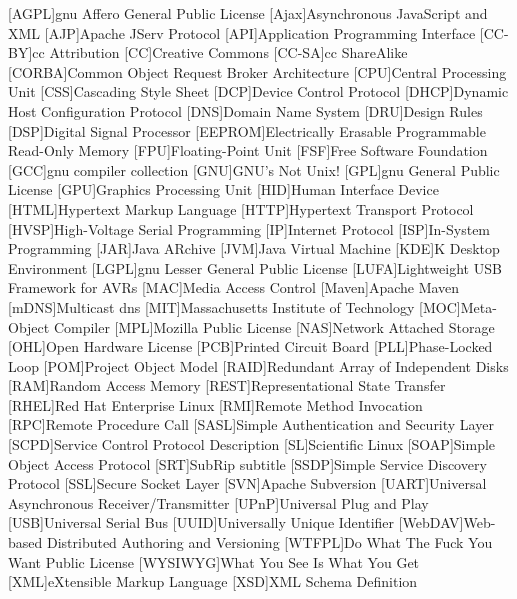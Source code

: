 \begin{acronym}[WYSIWYG]	%
[AGPL]{\acs{gnu} Affero General Public License}
[Ajax]{Asynchronous JavaScript and XML}
[AJP]{Apache JServ Protocol}
[API]{Application Programming Interface}
[CC-BY]{\acl{cc} Attribution}
[CC]{Creative Commons}
[CC-SA]{\acl{cc} ShareAlike}
[CORBA]{Common Object Request Broker Architecture}
[CPU]{Central Processing Unit}
[CSS]{Cascading Style Sheet}
[DCP]{Device Control Protocol}
[DHCP]{Dynamic Host Configuration Protocol}
[DNS]{Domain Name System}
[DRU]{Design Rules}
[DSP]{Digital Signal Processor}
[EEPROM]{Electrically Erasable Programmable Read-Only Memory}
[FPU]{Floating-Point Unit}
[FSF]{Free Software Foundation}
[GCC]{\acs{gnu} compiler collection}
[GNU]{GNU's Not Unix!}
[GPL]{\acs{gnu} General Public License}
[GPU]{Graphics Processing Unit}
[HID]{Human Interface Device}
[HTML]{Hypertext Markup Language}
[HTTP]{Hypertext Transport Protocol}
[HVSP]{High-Voltage Serial Programming}
[IP]{Internet Protocol}
[ISP]{In-System Programming}
[JAR]{Java ARchive}
[JVM]{Java Virtual Machine}
[KDE]{K Desktop Environment}
[LGPL]{\acs{gnu} Lesser General Public License}
[LUFA]{Lightweight USB Framework for AVRs}
[MAC]{Media Access Control}
[Maven]{Apache Maven}
[mDNS]{Multicast \acs{dns}}
[MIT]{Massachusetts Institute of Technology}
[MOC]{Meta-Object Compiler}
[MPL]{Mozilla Public License}
[NAS]{Network Attached Storage}
[OHL]{Open Hardware License}
[PCB]{Printed Circuit Board}
[PLL]{Phase-Locked Loop}
[POM]{Project Object Model}
[RAID]{Redundant Array of Independent Disks}
[RAM]{Random Access Memory}
[REST]{Representational State Transfer}
[RHEL]{Red Hat Enterprise Linux}
[RMI]{Remote Method Invocation}
[RPC]{Remote Procedure Call}
[SASL]{Simple Authentication and Security Layer}
[SCPD]{Service Control Protocol Description}
[SL]{Scientific Linux}
[SOAP]{Simple Object Access Protocol}
[SRT]{SubRip subtitle}
[SSDP]{Simple Service Discovery Protocol}
[SSL]{Secure Socket Layer}
[SVN]{Apache Subversion}
[UART]{Universal Asynchronous Receiver/Transmitter}
[UPnP]{Universal Plug and Play}
[USB]{Universal Serial Bus}
[UUID]{Universally Unique Identifier}
[WebDAV]{Web-based Distributed Authoring and Versioning}
[WTFPL]{Do What The Fuck You Want Public License}
[WYSIWYG]{What You See Is What You Get}
[XML]{eXtensible Markup Language}
[XSD]{XML Schema Definition}
\end{acronym}
